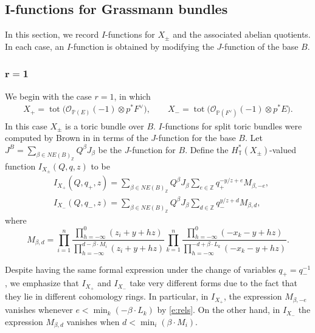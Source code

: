 \documentclass[11pt]{article}
\numberwithin{equation}{section}
\numberwithin{equation}{section}
\newcommand{\cc}[1]{\mathcal{#1}} %
\newcommand{\ZZ}{\mathbb{Z}}
\newcommand{\PP}{\mathbb{P}}
\newcommand{\torus}{\mathbb{T}}
\DeclareMathOperator{\tot}{tot}
\newcommand{\op}[1]{\operatorname{#1}}
\newcommand{\F}{F}
\newcommand{\E}{E}
\newcommand{\MB}{M}
\newcommand{\LB}{L}
\newcommand{\z}{z}
\newcommand{\x}{x}
\newcommand{\y}{y}
\begin{document}
\subsection[I-functions for Grassmann bundles]{$\boldsymbol{I}$-functions for Grassmann bundles}
In this section, we record $I$-functions for $X_\pm$ and the associated abelian quotients. In each case, an $I$-function is obtained by modifying the $J$-function of the base $B$.

\subsubsection[r=1]{$\boldsymbol{r=1}$}
We begin with the case $r=1$,
in which
\begin{align*}
X_{+} = \tot \bigl( \cc O_{\PP(\E)}(-1) \otimes p^*\F^\vee\bigr),\qquad
X_{-} =\tot \bigl( \cc O_{\PP(\F^\vee)}(-1) \otimes p^*\E\bigr).
\end{align*}
In this case $X_{\pm}$ is a toric bundle over $B$. $I$-functions for split toric bundles were computed by Brown in \cite{Brown} in terms of the $J$-function for the base $B$. Let $J^B = \sum_{\beta \in NE(B)_\ZZ} Q^\beta J_\beta$ be the $J$-function for $B$. Define the $H^*_\torus(X_\pm)$-valued function $I_{X_\pm}(Q, q, z)$ to be
\begin{align*}
&I_{X_+}(Q, q_+, z) =\sum_{\beta \in NE(B)_\ZZ} Q^\beta J_\beta \sum_{e \in \ZZ} q_+^{-\y/z+e} M_{\beta, -e} ,\\
&I_{X_-}(Q, q_-, z) =\sum_{\beta \in NE(B)_\ZZ} Q^\beta J_\beta \sum_{d \in \ZZ} q_-^{\y/z+d} M_{\beta, d},
\end{align*}
where
\begin{equation}\label{hmod} M_{\beta, d} =
\prod_{i=1}^n \frac{\prod_{h=-\infty}^0 (\z_i+\y+hz)}{\prod_{h=-\infty}^{d-\beta\cdot \MB_i} (\z_i+\y+hz)}\prod_{k=1}^{n}\frac{\prod_{h=-\infty}^{0}(-\x_k -\y+hz)}{\prod_{h=-\infty}^{-d+\beta\cdot \LB_k}(-\x_k -\y+hz)}.\end{equation}
\begin{Remark}
Despite having the same formal expression under the change of variables $q_+ = q_-^{-1}$, we emphasize that $I_{X_+}$ and $I_{X_-}$ take very different forms due to the fact that they lie in different cohomology rings. In particular, in $I_{X_+}$, the expression $M_{\beta, -e}$ vanishes whenever $e < \op{min}_k(-\beta\cdot \LB_k)$ by \eqref{e:rels}. On the other hand, in $I_{X_-}$ the expression $M_{\beta, d}$ vanishes when $d < \op{min}_i(\beta\cdot \MB_i)$.

\end{Remark}
\end{document}

